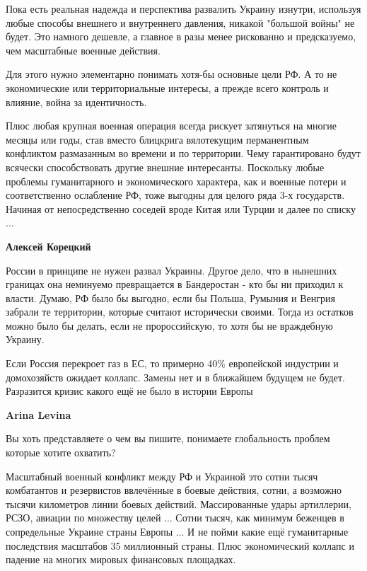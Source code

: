 \begin{itemize}
\begin{itemize}
\end{itemize} %


Пока есть реальная надежда и перспектива развалить Украину изнутри, используя
любые способы внешнего и внутреннего давления, никакой "большой войны" не
будет. Это намного дешевле, а главное в разы менее рискованно и предсказуемо,
чем масштабные военные действия.

Для этого нужно элементарно понимать хотя-бы основные цели РФ. А то не
экономические или территориальные интересы, а прежде всего контроль и влияние,
война за идентичность.

Плюс любая крупная военная операция всегда рискует затянуться на многие месяцы
или годы, став вместо блицкрига вялотекущим перманентным конфликтом размазанным
во времени и по территории. Чему гарантировано будут всячески способствовать
другие внешние интересанты. Поскольку любые проблемы гуманитарного и
экономического характера, как и военные потери и соответственно ослабление РФ,
тоже выгодны для целого ряда 3-х государств. Начиная от непосредственно соседей
вроде Китая или Турции и далее по списку ...

\begin{itemize} %
\textbf{Алексей Корецкий} 

России в принципе не нужен развал Украины. Другое дело, что в нынешних границах
она неминуемо превращается в Бандеростан - кто бы ни приходил к власти. Думаю,
РФ было бы выгодно, если бы Польша, Румыния и Венгрия забрали те территории,
которые считают исторически своими. Тогда из остатков можно было бы делать,
если не пророссийскую, то хотя бы не враждебную Украину.

\end{itemize} %


Если Россия перекроет газ в ЕС, то примерно 40\% европейской индустрии и
домохозяйств ожидает коллапс. Замены нет и в ближайшем будущем не будет.
Разразится кризис какого ещё не было в истории Европы

\begin{itemize} %
\textbf{Arina Levina}

Вы хоть представляете о чем вы пишите, понимаете глобальность проблем которые
хотите охватить?

Масштабный военный конфликт между РФ и Украиной это сотни тысяч комбатантов и
резервистов ввлечённые в боевые действия, сотни, а возможно тысячи километров
линии боевых действий. Массированные удары артиллерии, РСЗО, авиации по
множеству целей ... Сотни тысяч, как минимум беженцев в сопредельные Украине
страны Европы ... И не пойми какие ещё гуманитарные последствия масштабов 35
миллионный страны. Плюс экономический коллапс и падение на многих мировых
финансовых площадках.


\end{itemize}
\end{itemize}
